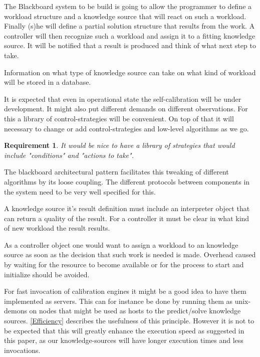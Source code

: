 \documentclass[]{lofar}
\newcounter{reqnum}
\newtheorem{requirement}[reqnum]{Requirement}
\begin{document}
    The Blackboard system to be build is going to allow the programmer
    to define a workload structure and a knowledge source that will
    react on such a workload. Finally (s)he will define a partial
    solution structure that results from the work. A controller will
    then recognize such a workload and assign it to a fitting
    knowledge source. It will be notified that a result is produced
    and think of what next step to take.

    Information on what type of knowledge source can take on what kind
    of workload will be stored in a database.

    It is expected that even in operational state the self-calibration
    will be under development. It might also put different demands on
    different observations. For this a library of control-strategies
    will be convenient. On top of that it will necessary to change or
    add control-strategies and low-level algorithms as we go.

    \begin{requirement}
      It would be nice to have a library of strategies that
      would include "conditions" and "actions to
      take".
      \label{req:strategies}
    \end{requirement}

    The blackboard architectural pattern facilitates this tweaking of
    different algorithms by its loose coupling. The different
    protocols between components in the system need to be very well
    specified for this.

    A knowledge source it's result definition must include an
    interpreter object that can return a quality of the result. For a
    controller it must be clear in what kind of new workload the
    result results.

    As a controller object one would want to assign a workload to an
    knowledge source as soon as the decision that such work is needed
    is made. Overhead caused by waiting for the resource to become
    available or for the process to start and initialize should be
    avoided.

    For fast invocation of calibration engines it might be a good
    idea to have them implemented as servers. This can for instance be
    done by running them as unix-demons on nodes that might be used as
    hosts to the predict/solve knowledge
    sources. \hyperlink{bib:Efficiency}{[Efficiency]} describes the
    usefulness of this principle. However it is not to be expected
    that this will greatly enhance the execution speed as suggested in
    this paper, as our knowledge-sources will have longer execution
    times and less invocations.
\end{document}
